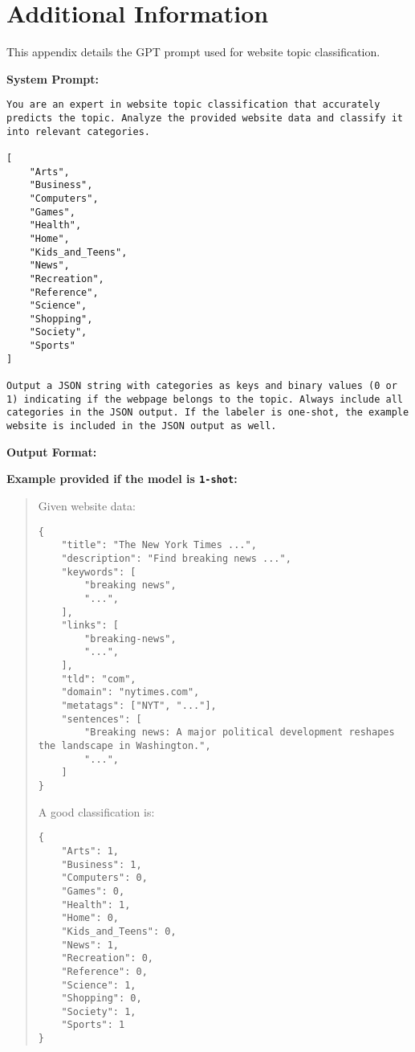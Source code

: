 \section{Additional Information}
\label{app:prompt}
This appendix details the GPT prompt used for website topic classification. 

\textbf{System Prompt:} 
\begin{quote}
\end{quote}

\begin{lstlisting}
You are an expert in website topic classification that accurately predicts the topic. Analyze the provided website data and classify it into relevant categories.

[
    "Arts",
    "Business",
    "Computers",
    "Games",
    "Health",
    "Home", 
    "Kids_and_Teens",
    "News",
    "Recreation",
    "Reference",
    "Science", 
    "Shopping",
    "Society",
    "Sports"
]

Output a JSON string with categories as keys and binary values (0 or 1) indicating if the webpage belongs to the topic. Always include all categories in the JSON output. If the labeler is one-shot, the example website is included in the JSON output as well.
\end{lstlisting}

\textbf{Output Format:}
\begin{quote}
\end{quote}

\textbf{Example provided if the model is \texttt{1-shot}:}
\begin{quote}
    Given website data: \\
    \begin{verbatim}
{         
    "title": "The New York Times ...",
    "description": "Find breaking news ...",
    "keywords": [
        "breaking news",
        "...",
    ],
    "links": [
        "breaking-news",
        "...",
    ],
    "tld": "com",
    "domain": "nytimes.com",
    "metatags": ["NYT", "..."],
    "sentences": [
        "Breaking news: A major political development reshapes the landscape in Washington.",
        "...",
    ]
}
        \end{verbatim}
    A good classification is:
    \begin{verbatim}
{
    "Arts": 1,
    "Business": 1,
    "Computers": 0,
    "Games": 0,
    "Health": 1,
    "Home": 0,
    "Kids_and_Teens": 0,
    "News": 1,
    "Recreation": 0,
    "Reference": 0,
    "Science": 1,
    "Shopping": 0,
    "Society": 1,
    "Sports": 1
}
    \end{verbatim}
\end{quote}


